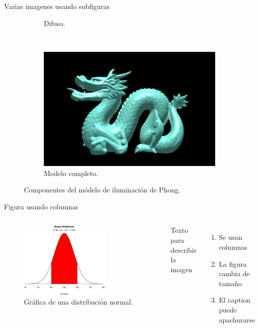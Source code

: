 \begin{frame}{Varias imagenes usando subfiguras}
\begin{figure}[htp]
\begin{subfigure}[b]{0.2\textwidth}
   \caption{Difusa.}
   \label{fig:2c}
 \end{subfigure}
\\
 \begin{subfigure}[b]{0.35\textwidth}
   \includegraphics[width=\textwidth]{img/completo}
   \caption{Modelo completo.}
   \label{fig:2d}
 \end{subfigure}
  \caption{Componentes del módelo de iluminación de Phong.}
  \label{fig:two}
\end{figure}
\end{frame}

\begin{frame}{Figura usando columnas}
\begin{columns}
 \begin{figure}[htb]
  \centering
  \includegraphics[width=0.7\textwidth]{img/normal}
\caption{Gráfica de una distribución normal.}
\end{figure}    
     Texto para describir la imagen
     \begin{enumerate}
         \item Se usan columnas
         \item La figura cambia de tamaño
         \item El caption puede apachurarse
     \end{enumerate}
\end{columns}
\end{frame}

